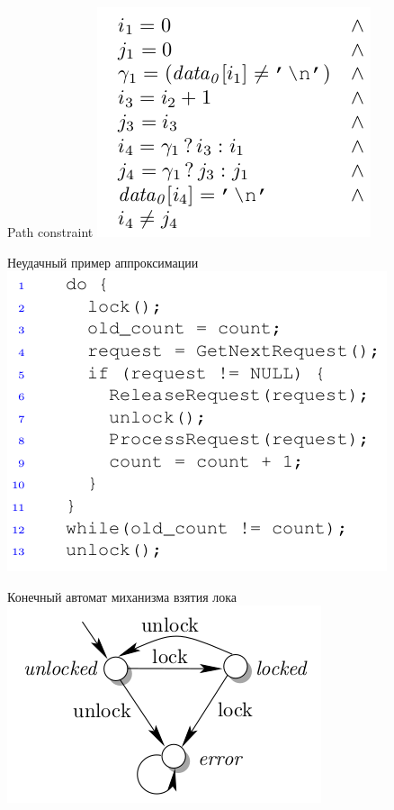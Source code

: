 \documentclass{beamer}
\begin{document}
\begin{frame}{Path constraint}
\includegraphics[scale=0.5]{path_constraint3.png}
\end{frame}

\begin{frame}{Неудачный пример аппроксимации}
\includegraphics[scale=0.5]{example3.png}
\end{frame}

\begin{frame}{Конечный автомат миханизма взятия лока}
\includegraphics[scale=0.5]{lock_automaton.png}
\end{frame}
\end{document}
